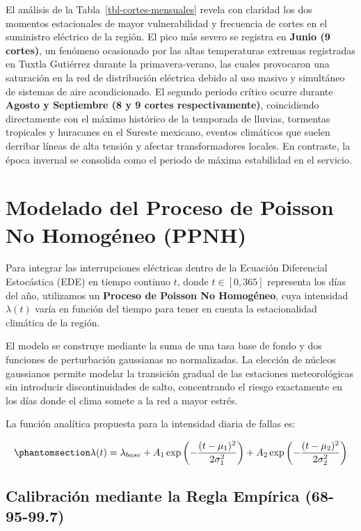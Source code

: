 \documentclass[
  spanish,
  letterpaper,
  DIV=11,
  numbers=noendperiod]{scrreprt}
\theoremstyle{plain}
\theoremstyle{plain}
\theoremstyle{plain}
\theoremstyle{definition}
\theoremstyle{remark}
\begin{document}
El análisis de la Tabla~\ref{tbl-cortes-mensuales} revela con claridad
los dos momentos estacionales de mayor vulnerabilidad y frecuencia de
cortes en el suministro eléctrico de la región. El pico más severo se
registra en \textbf{Junio (9 cortes)}, un fenómeno ocasionado por las
altas temperaturas extremas registradas en Tuxtla Gutiérrez durante la
primavera-verano, las cuales provocaron una saturación en la red de
distribución eléctrica debido al uso masivo y simultáneo de sistemas de
aire acondicionado. El segundo periodo crítico ocurre durante
\textbf{Agosto y Septiembre (8 y 9 cortes respectivamente)},
coincidiendo directamente con el máximo histórico de la temporada de
lluvias, tormentas tropicales y huracanes en el Sureste mexicano,
eventos climáticos que suelen derribar líneas de alta tensión y afectar
transformadores locales. En contraste, la época invernal se consolida
como el periodo de máxima estabilidad en el servicio.

\section{Modelado del Proceso de Poisson No Homogéneo
(PPNH)}\label{sec-ppnh}

Para integrar las interrupciones eléctricas dentro de la Ecuación
Diferencial Estocástica (EDE) en tiempo continuo \(t\), donde
\(t \in [0, 365]\) representa los días del año, utilizamos un
\textbf{Proceso de Poisson No Homogéneo}, cuya intensidad \(\lambda(t)\)
varía en función del tiempo para tener en cuenta la estacionalidad
climática de la región.

El modelo se construye mediante la suma de una tasa base de fondo y dos
funciones de perturbación gaussianas no normalizadas. La elección de
núcleos gaussianos permite modelar la transición gradual de las
estaciones meteorológicas sin introducir discontinuidades de salto,
concentrando el riesgo exactamente en los días donde el clima somete a
la red a mayor estrés.

La función analítica propuesta para la intensidad diaria de fallas es:

\begin{equation}\phantomsection\label{eq-lambda-teorica}{
\lambda(t) = \lambda_{base} + A_1 \exp\left(-\frac{(t - \mu_1)^2}{2\sigma_1^2}\right) + A_2 \exp\left(-\frac{(t - \mu_2)^2}{2\sigma_2^2}\right)
}\end{equation}

\subsection{Calibración mediante la Regla Empírica
(68-95-99.7)}\label{calibraciuxf3n-mediante-la-regla-empuxedrica-68-95-99.7}
\end{document}
